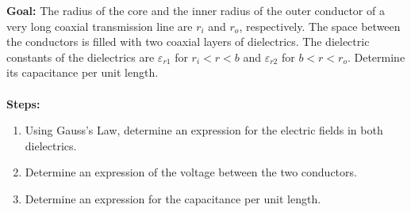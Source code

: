 \documentclass[../../header.tex]{subfiles}
\begin{document}
\textbf{Goal:} The radius of the core and the inner radius of the outer conductor of a very long coaxial transmission line are $r_i$ and $r_o$, respectively. The space between the conductors is filled with two coaxial layers of dielectrics. The dielectric constants of the dielectrics are $\varepsilon_{r1}$ for $r_i < r < b$ and $\varepsilon_{r2}$ for $b < r < r_o$. Determine its capacitance per unit length.\\
\\
\textbf{Steps:} 
\begin{enumerate}
\item Using Gauss's Law, determine an expression for the electric fields in both dielectrics.


\item Determine an expression of the voltage between the two conductors.


\item Determine an expression for the capacitance per unit length.

\end{enumerate}
\end{document}
